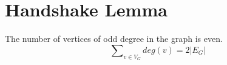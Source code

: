 \documentclass{article}
\begin{document}

\section{Handshake Lemma}
\begin{definition}
The number of vertices of odd degree in the graph is even.\\

\begin{equation*}
\sum\nolimits_{v \in V_G} deg(v) = 2 | E_G|
\end{equation*}

\end{definition}
\end{document}
